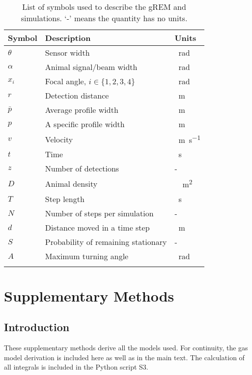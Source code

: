 \documentclass[a4paper,10pt,reqno,oneside]{amsart}
\begin{document}
\begin{table}[h!]
\centering
\begin{tabular}{lll}
Symbol 	& Description & Units\\\hline
$\theta$	& Sensor width & \SI{}{\radian} \\
$\alpha$	& Animal signal/beam width & \SI{}{\radian} \\
$x_i$	        & Focal angle, $i \in \{1,2,3,4\} $ 	& \SI{}{\radian}\\
$r$ 		& Detection distance & \SI{}{\meter}\\
$\bar{p}$ 		& Average profile width & \SI{}{\meter}\\
$p$ 		& A specific profile width & \SI{}{\meter}\\
$v$		& Velocity & \SI{}{\meter\per\second}\\
$t$		& Time & \SI{}{\second}\\
$z$		& Number of detections & -\\
$D$		& Animal density & \SI{}{\per\meter\squared} \\
$T$ 		& Step length & \SI{}{\second}\\
$N$ 		& Number of steps per simulation & -\\
$d$ 		& Distance moved in a time step & \SI{}{\meter}\\
$S$ 		& Probability of remaining stationary & -\\
$A$ 		& Maximum turning angle & \SI{}{\radian}\\
\\
\end{tabular}
\caption{List of symbols used to describe the gREM and simulations. `-' means the quantity has no units.}
\label{t:paras}
\end{table}

\clearpage

\section{Supplementary Methods}
\subsection{Introduction}
These supplementary methods derive all the models used. For continuity, the gas model derivation is included here as well as in the main text. The calculation of all integrals is included in the Python script S3. 





\end{document}
